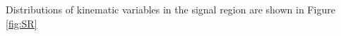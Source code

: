 
%

%    
%    
%    
%    
%    

\indent Distributions of kinematic variables in the signal region are shown in Figure \ref{fig:SR} \\

